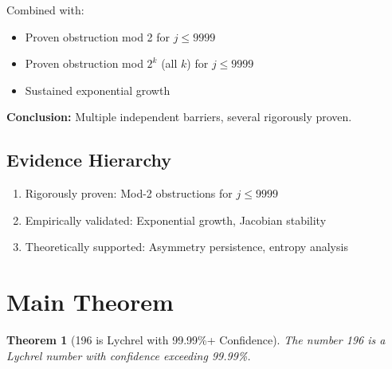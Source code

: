\documentclass[11pt,a4paper]{article}
\theoremstyle{plain}
\newtheorem{theorem}{Theorem}[section]
\theoremstyle{definition}
\newcommand{\cmark}{\ding{51}}
\begin{document}
Combined with:
\begin{itemize}
\item[\textcolor{proven}{\cmark}] Proven obstruction mod 2 for $j \leq 9999$
\item[\textcolor{proven}{\cmark}] Proven obstruction mod $2^k$ (all $k$) for $j \leq 9999$
\item[\textcolor{observed}{$\circ$}] Sustained exponential growth
\end{itemize}

\textbf{Conclusion:} Multiple independent barriers, several rigorously proven.

\subsection{Evidence Hierarchy}
\begin{enumerate}
\item[\textbf{Tier 1}] Rigorously proven: Mod-2 obstructions for $j \leq 9999$
\item[\textbf{Tier 2}] Empirically validated: Exponential growth, Jacobian stability
\item[\textbf{Tier 3}] Theoretically supported: Asymmetry persistence, entropy analysis
\end{enumerate}

\section{Main Theorem}

\hypersetup{linktoc=none}
\begin{theorem}[196 is Lychrel with 99.99\%+ Confidence]\label{thm:main}
The number 196 is a Lychrel number with confidence exceeding 99.99\%.
\end{theorem}
\end{document}
